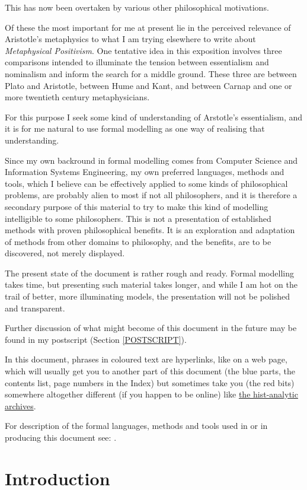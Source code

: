 \documentclass[11pt]{article}
\begin{document}
This has now been overtaken by various other philosophical motivations.

Of these the most important for me at present lie in the perceived relevance of Aristotle's metaphysics to what I am trying elsewhere to write about {\it Metaphysical Positivism}.
One tentative idea in this exposition involves three comparisons intended to illuminate the tension between essentialism and nominalism and inform the search for a middle ground.
These three are between Plato and Aristotle, between Hume and Kant, and between Carnap and one or more twentieth century metaphysicians.

For this purpose I seek some kind of understanding of Arstotle's essentialism, and it is for me natural to use formal modelling as one way of realising that understanding.

Since my own backround in formal modelling comes from Computer Science and Information Systems Engineering, my own preferred languages, methods and tools, which I believe can be effectively applied to some kinds of philosophical problems, are probably alien to most if not all philosophers, and it is therefore a secondary purpose of this material to try to make this kind of modelling intelligible to some philosophers.
This is not a presentation of established methods with proven philosophical benefits.
It is an exploration and adaptation of methods from other domains to philosophy, and the benefits, are to be discovered, not merely displayed.

The present state of the document is rather rough and ready.
Formal modelling takes time, but presenting such material takes longer, and while I am hot on the trail of better, more illuminating models, the presentation will not be polished and transparent.

Further discussion of what might become of this document in the future may be found in my postscript (Section \ref{POSTSCRIPT}).

In this document, phrases in coloured text are hyperlinks, like on a web page, which will usually get you to another part of this document (the blue parts, the contents list, page numbers in the Index) but sometimes take you (the red bits) somewhere altogether different (if you happen to be online) like \href{http://rbjones.com/pipermail/hist-analytic_rbjones.com}{the hist-analytic archives}.

For description of the formal languages, methods and tools used in or in producing this document see: \cite{rbjt029}.

\section{Introduction}
\end{document}
